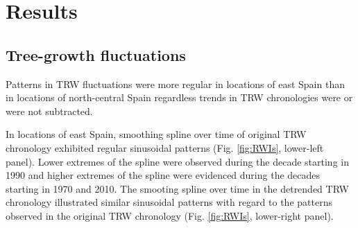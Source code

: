 \documentclass[review,authoryear]{elsarticle}
\begin{document}



\section{Results}
\subsection{Tree-growth fluctuations}
Patterns in \gls{TRW} fluctuations were more regular in locations
of east Spain than in locations of north-central Spain regardless
trends in \gls{TRW} chronologies were or were not subtracted.

In locations of east Spain, smoothing spline over time of original
\gls{TRW} chronology exhibited regular sinusoidal patterns
(Fig. \ref{fig:RWIs}, lower-left panel). Lower extremes of the spline
were observed during the decade starting in 1990 and higher extremes
of the spline were evidenced during the decades starting in 1970 and
2010. The smooting spline over time in the detrended \gls{TRW}
chronology illustrated similar sinusoidal patterns with regard to the
patterns observed in the original \gls{TRW} chronology
(Fig. \ref{fig:RWIs}, lower-right panel).
\end{document}

